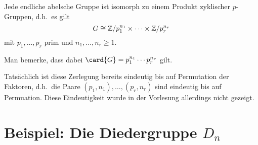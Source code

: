 \begin{corollary}
  Jede endliche abelsche Gruppe ist isomorph zu einem Produkt zyklischer $p$-Gruppen, d.h.\ es gilt
  \[
          G
    \cong \mathbb{Z}/p_1^{n_1} \times \dotsm \times \mathbb{Z}/p_r^{n_r}
  \]
  mit $p_1, \dotsc, p_r$ prim und $n_1, \dotsc, n_r \geq 1$.
\end{corollary}

Man bemerke, dass dabei $\card{G} = p_1^{n_1} \dotsm p_r^{n_r}$ gilt.

\begin{remark}
  Tatsächlich ist diese Zerlegung bereits eindeutig bis auf Permutation der Faktoren, d.h.\ die Paare $(p_1, n_1), \dotsc, (p_r, n_r)$ sind eindeutig bis auf Permuation.
  Diese Eindeutigkeit wurde in der Vorlesung allerdings nicht gezeigt.
\end{remark}





\section{Beispiel: Die Diedergruppe \texorpdfstring{$D_n$}{D\_n}}

